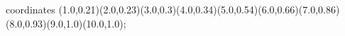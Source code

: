 					coordinates { (1.0,0.21)(2.0,0.23)(3.0,0.3)(4.0,0.34)(5.0,0.54)(6.0,0.66)(7.0,0.86)(8.0,0.93)(9.0,1.0)(10.0,1.0)};